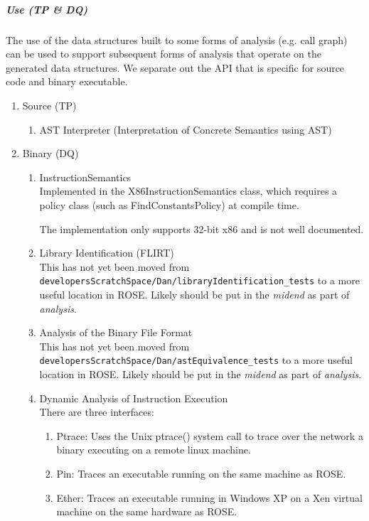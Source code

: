 \subparagraph{Use (TP \& DQ)}
   The use of the data structures built to some forms of analysis (e.g. call graph)
can be used to support subsequent forms of analysis that operate on the generated
data structures. We separate out the API that is specific for source code and 
binary executable.
\begin{enumerate}
   \item Source (TP) \\
   \begin{enumerate}
      \item AST Interpreter (Interpretation of Concrete Semantics using AST)
   \end{enumerate}

   \item Binary (DQ) \\
   \begin{enumerate}
      \item InstructionSemantics \\
	Implemented in the X86InstructionSemantics class, which
	requires a policy class (such as FindConstantsPolicy) at
	compile time.

	The implementation only supports 32-bit x86 and is not well
	documented.
      
      \item Library Identification (FLIRT) \\
      This has not yet been moved from {\tt developersScratchSpace/Dan/libraryIdentification\_tests}
      to a more useful location in ROSE.  Likely should be put in the {\em midend} as part
      of {\em analysis}.

      \item Analysis of the Binary File Format \\
      This has not yet been moved from {\tt developersScratchSpace/Dan/astEquivalence\_tests}
      to a more useful location in ROSE.  Likely should be put in the {\em midend} as part
      of {\em analysis}.

      \item Dynamic Analysis of Instruction Execution \\
      There are three interfaces:
      \begin{enumerate}
         \item Ptrace: Uses the Unix ptrace() system call to trace over 
               the network a binary executing on a remote linux machine.
         \item Pin: Traces an executable running on the same machine as ROSE.
         \item Ether: Traces an executable running in Windows XP on 
               a Xen virtual machine on the same hardware as ROSE.
      \end{enumerate}


\end{enumerate}
\end{enumerate}
